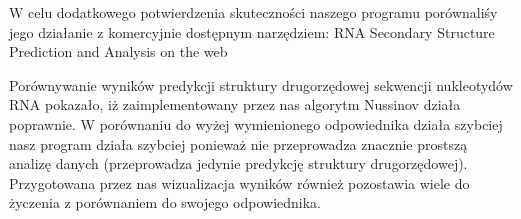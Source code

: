 
W celu dodatkowego potwierdzenia skuteczności naszego programu porównaliśy jego działanie z komercyjnie dostępnym narzędziem: RNA Secondary Structure Prediction and Analysis on the web \cite{bib:innaApp}

Porównywanie wyników predykcji struktury drugorzędowej sekwencji nukleotydów RNA pokazało, iż zaimplementowany przez nas algorytm Nussinov działa poprawnie. W porównaniu do wyżej wymienionego odpowiednika działa szybciej nasz program działa szybciej ponieważ nie przeprowadza znacznie prostszą analizę danych (przeprowadza jedynie predykcję struktury drugorzędowej). Przygotowana przez nas wizualizacja wyników również pozostawia wiele do życzenia z porównaniem do swojego odpowiednika.
